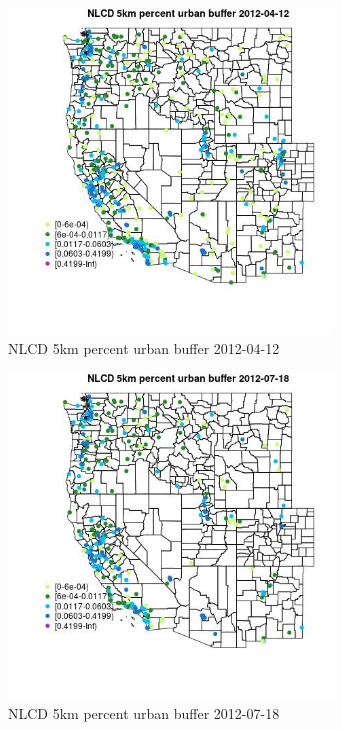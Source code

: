 \begin{figure} 
\centering  
\includegraphics[width=0.77\textwidth]{Code_Outputs/Report_ML_input_PM25_Step4_part_e_de_duplicated_aves_compiled_2019-05-14wNAs_MapObsNLCD_5km_percent_urban_buffer2012-04-12.jpg} 
\caption{\label{fig:Report_ML_input_PM25_Step4_part_e_de_duplicated_aves_compiled_2019-05-14wNAsMapObsNLCD_5km_percent_urban_buffer2012-04-12}NLCD 5km percent urban buffer 2012-04-12} 
\end{figure} 
 

\begin{figure} 
\centering  
\includegraphics[width=0.77\textwidth]{Code_Outputs/Report_ML_input_PM25_Step4_part_e_de_duplicated_aves_compiled_2019-05-14wNAs_MapObsNLCD_5km_percent_urban_buffer2012-07-18.jpg} 
\caption{\label{fig:Report_ML_input_PM25_Step4_part_e_de_duplicated_aves_compiled_2019-05-14wNAsMapObsNLCD_5km_percent_urban_buffer2012-07-18}NLCD 5km percent urban buffer 2012-07-18} 
\end{figure} 
 

